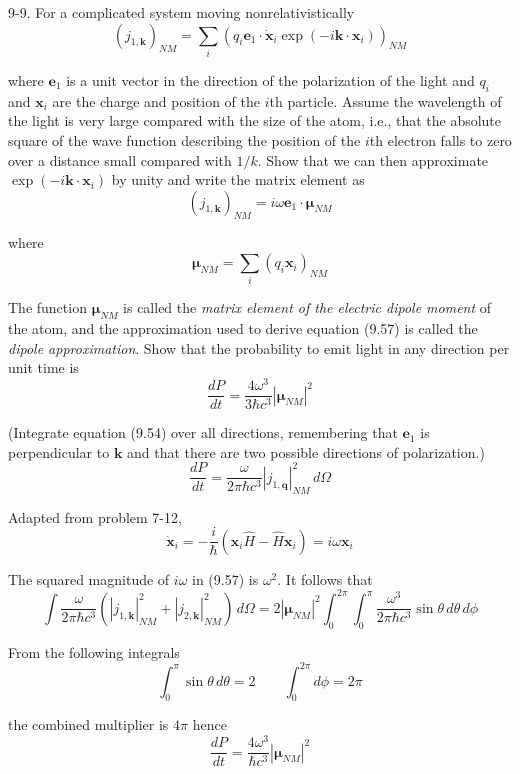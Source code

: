 \documentclass[12pt]{article}
\begin{document}
9-9.
For a complicated system moving nonrelativistically
\begin{equation*}
(j_{1,\mathbf k})_{NM}=\sum_i\left(
q_i\mathbf e_1\cdot\dot{\mathbf x}_i
\exp(-i\mathbf k\cdot\mathbf x_i)\right)_{NM}
\end{equation*}

where $\mathbf e_1$ is a unit vector in the direction of the
polarization of the light and $q_i$ and $\mathbf x_i$ are the
charge and position of the $i$th particle.
Assume the wavelength of the light is very large compared with the
size of the atom, i.e., that the absolute square of the wave function
describing the position of the $i$th electron falls to zero over a
distance small compared with $1/k$.
Show that we can then approximate $\exp(-i\mathbf k\cdot\mathbf x_i)$
by unity and write the matrix element as
\begin{equation*}
(j_{1,\mathbf k})_{NM}=i\omega\mathbf e_1\cdot\boldsymbol\mu_{NM}
\tag{9.57}
\end{equation*}

where
\begin{equation*}
\boldsymbol\mu_{NM}=\sum_i(q_i\mathbf x_i)_{NM}
\tag{9.58}
\end{equation*}

The function $\boldsymbol\mu_{NM}$ is called the
{\it matrix element of the electric dipole moment}
of the atom, and the approximation used to derive equation (9.57)
is called the {\it dipole approximation}.
Show that the probability to emit light in any direction per unit time is
\begin{equation*}
\frac{dP}{dt}=\frac{4\omega^3}{3\hbar c^3}\left|\boldsymbol\mu_{NM}\right|^2
\tag{9.59}
\end{equation*}

(Integrate equation (9.54) over all directions, remembering that
$\mathbf e_1$ is perpendicular to $\mathbf k$ and that there are two
possible directions of polarization.)
\begin{equation*}
\frac{dP}{dt}=\frac{\omega}{2\pi\hbar c^3}\left|j_{1,\mathbf q}\right|_{NM}^2
\,d\Omega
\tag{9.54}
\end{equation*}

Adapted from problem 7-12,
\begin{equation*}
\dot{\mathbf x}_i=-\frac{i}{\hbar}(\mathbf x_i\hat H-\hat H\mathbf x_i)=i\omega\mathbf x_i
\end{equation*}

The squared magnitude of $i\omega$ in (9.57) is $\omega^2$.
It follows that
\begin{equation*}
\int\frac{\omega}{2\pi\hbar c^3}
\left(\left|j_{1,\mathbf k}\right|_{NM}^2+\left|j_{2,\mathbf k}\right|_{NM}^2\right)
\,d\Omega
=2\left|\boldsymbol\mu_{NM}\right|^2
\int_0^{2\pi}\int_0^\pi
\frac{\omega^3}{2\pi\hbar c^3}
\sin\theta
\,d\theta\,d\phi
\end{equation*}

From the following integrals
\begin{equation*}
\int_0^\pi\sin\theta\,d\theta=2
\qquad
\int_0^{2\pi}d\phi=2\pi
\end{equation*}

the combined multiplier is $4\pi$ hence
\begin{equation*}
\frac{dP}{dt}
=\frac{4\omega^3}{\hbar c^3}
\left|\boldsymbol\mu_{NM}\right|^2
\end{equation*}
\end{document}
